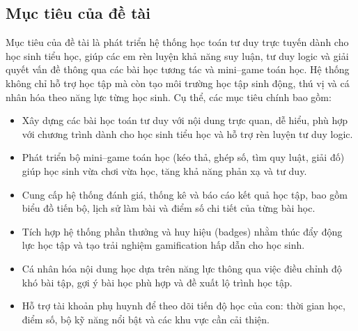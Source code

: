 \subsection{Mục tiêu của đề tài}
Mục tiêu của đề tài là phát triển hệ thống học toán tư duy trực tuyến dành cho học sinh tiểu học, giúp các em rèn luyện khả năng suy luận, tư duy logic và giải quyết vấn đề thông qua các bài học tương tác và mini–game toán học. Hệ thống không chỉ hỗ trợ học tập mà còn tạo môi trường học tập sinh động, thú vị và cá nhân hóa theo năng lực từng học sinh. Cụ thể, các mục tiêu chính bao gồm:

\begin{itemize}

    \item Xây dựng các bài học toán tư duy với nội dung trực quan, dễ hiểu, phù hợp với chương trình dành cho học sinh tiểu học và hỗ trợ rèn luyện tư duy logic.

    \item Phát triển bộ mini–game toán học (kéo thả, ghép số, tìm quy luật, giải đố) giúp học sinh vừa chơi vừa học, tăng khả năng phản xạ và tư duy.

    \item Cung cấp hệ thống đánh giá, thống kê và báo cáo kết quả học tập, bao gồm biểu đồ tiến bộ, lịch sử làm bài và điểm số chi tiết của từng bài học.

    \item Tích hợp hệ thống phần thưởng và huy hiệu (badges) nhằm thúc đẩy động lực học tập và tạo trải nghiệm gamification hấp dẫn cho học sinh.

    \item Cá nhân hóa nội dung học dựa trên năng lực thông qua việc điều chỉnh độ khó bài tập, gợi ý bài học phù hợp và đề xuất lộ trình học tập.

    \item Hỗ trợ tài khoản phụ huynh để theo dõi tiến độ học của con: thời gian học, điểm số, bộ kỹ năng nổi bật và các khu vực cần cải thiện.

\end{itemize}

